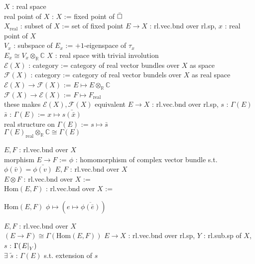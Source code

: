\documentclass[dvipdfmx]{jsarticle}
\begin{document}
\begin{Definition}
\itemdefi
  \For \(X\) : real space \\
  \Define real point of \(X\) : \(X\) := fixed point of \(\bar{\square}\) \\
  \Define \(X_{\text{real}}\) : subset of \(X\) := set of fixed point
\itemprop
  \For \(E \to X\) : rl.vec.bnd over rl.sp, \(x\) : real point of \(X\) \\
  \Let \(V_{x}\) : subspace of \(E_{x}\) := \(+1\)-eigenspace of \(\tau_{x}\) \\
  \Then \(E_{x} \cong V_{x} \otimes_{\mathbb{R}} \mathbb{C}\)
\itemprop
  \For \(X\) : real space with trivial involution \\
  \Define \(\mathcal{E}(X)\) : category := category of real vector bundles over \(X\) as space \\
  \Define \(\mathcal{F}(X)\) : category := category of real vector bundels over \(X\) as real space \\
  \Let \(\mathcal{E}(X) \to \mathcal{F}(X)\) := \(E \mapsto E \otimes_{\mathbb{R}} \mathbb{C}\) \\
  \Let \(\mathcal{F}(X) \to \mathcal{E}(X)\) := \(F \mapsto F_{\text{real}}\) \\
  \Then these makes \(\mathcal{E}(X), \mathcal{F}(X)\) equivalent
\itemdefi
  \For \(E \to X\) : rl.vec.bnd over rl.sp, \(s\) : \(\Gamma(E)\) \\
  \Define \(\bar{s}\) : \(\Gamma(E)\) := \(x \mapsto \bar{s(\bar{x})}\) \\
  \Define real structure on \(\Gamma(E)\) := \(s \mapsto \bar{s}\) \\
  \Then \(\Gamma(E)_{\text{real}} \otimes_{\mathbb{R}} \mathbb{C} \cong \Gamma(E)\)
\end{Definition}

\begin{Definition}
\itemdefi
  \For \(E,F\) : rl.vec.bnd over \(X\) \\
  \Define morphism \(E \to F\) := \(\phi\) : homomorphism of complex vector bundle s.t. \(\phi(\bar{v}) = \bar{\phi(v)}\)
\itemdefi
  \For \(E,F\) : rl.vec.bnd over \(X\) \\
  \Define \(E \otimes F\) : rl.vec.bnd over \(X\) :=  \\
  \Define \(\text{Hom}(E,F)\) : rl.vec.bnd over \(X\) :=
  \begin{itemize}
    \itembase \(\text{Hom}(E,F)\)
    \itemenum \(\phi \mapsto (e \mapsto \overline{\phi(\bar{e})})\)
  \end{itemize}
\itemprop
  \For \(E,F\) : rl.vec.bnd over \(X\) \\
  \Then \((E \to F) \cong \Gamma(\text{Hom}(E,F))\)
\itemprop
  \For \(E \to X\) : rl.vec.bnd over rl.sp, \(Y\) : rl.sub.sp of \(X\), \(s\) : \(\Gamma(\left. {E} \right| _{Y})\) \\
  \Then \(\exists\) \(\tilde{s}\) : \(\Gamma(E)\) s.t. extension of \(s\)
\end{Definition}
\end{document}
